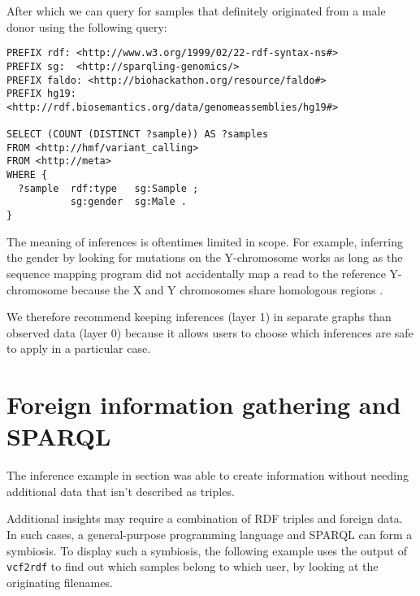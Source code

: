   After which we can query for samples that definitely originated from a male
  donor using the following query:

\begin{siderules}
\begin{verbatim}
PREFIX rdf: <http://www.w3.org/1999/02/22-rdf-syntax-ns#>
PREFIX sg:  <http://sparqling-genomics/>
PREFIX faldo: <http://biohackathon.org/resource/faldo#>
PREFIX hg19:  <http://rdf.biosemantics.org/data/genomeassemblies/hg19#>

SELECT (COUNT (DISTINCT ?sample)) AS ?samples
FROM <http://hmf/variant_calling>
FROM <http://meta>
WHERE {
  ?sample  rdf:type   sg:Sample ;
           sg:gender  sg:Male .
}
\end{verbatim}
\end{siderules}

  The meaning of inferences is oftentimes limited in scope.  For example,
  inferring the gender by looking for mutations on the Y-chromosome works
  as long as the sequence mapping program did not accidentally map a read
  to the reference Y-chromosome because the X and Y chromosomes share
  homologous regions \citep{El-Mogharbel2008}.

  We therefore recommend keeping inferences (layer 1) in separate graphs
  than observed data (layer 0) because it allows users to choose which
  inferences are safe to apply in a particular case.


\section{Foreign information gathering and SPARQL}

  The inference example in section 
  was able to create information without needing additional data that isn't
  described as triples.

  Additional insights may require a combination of RDF triples and foreign
  data.  In such cases, a general-purpose programming language and SPARQL can
  form a symbiosis.  To display such a symbiosis, the following example uses
  the output of \texttt{vcf2rdf} to find out which samples belong to which
  user, by looking at the originating filenames.

